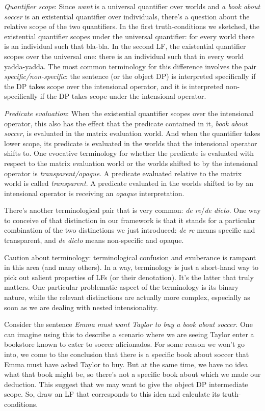\emph{Quantifier scope}: Since \emph{want} is a universal quantifier over
worlds and \emph{a book about soccer} is an existential quantifier over
individuals, there's a question about the relative scope of the two quantifiers.
In the first truth-conditions we sketched, the existential quantifier scopes
under the universal quantifier: for every world there is an individual such that
bla-bla. In the second LF, the existential quantifier scopes over the universal
one: there is an individual such that in every world yadda-yadda. The most
common terminology for this difference involves the pair
\emph{specific/non-specific}: the sentence (or the object DP) is interpreted
specifically if the DP takes scope over the intensional operator, and it is
interpreted non-specifically if the DP takes scope under the intensional operator.

\emph{Predicate evaluation}: When the existential quantifier scopes over the
intensional operator, this also has the effect that the predicate contained in
it, \emph{book about soccer}, is evaluated in the matrix evaluation world. And
when the quantifier takes lower scope, its predicate is evaluated in the worlds
that the intensional operator shifts to. One evocative terminology for whether
the predicate is evaluated with respect to the matrix evaluation world or the
worlds shifted to by the intensional operator is \emph{transparent/opaque}. A
predicate evaluated relative to the matrix world is called \emph{transparent}. A
predicate evaluated in the worlds shifted to by an intensional operator is
receiving an \emph{opaque} interpretation.

There's another terminological pair that is very common: \emph{de re}/\emph{de
  dicto}. One way to conceive of that distinction in our framework is that it
stands for a particular combination of the two distinctions we just introduced:
\emph{de re} means specific and transparent, and \emph{de dicto} means
non-specific and opaque.

Caution about terminology: terminological confusion and exuberance is rampant in
this area (and many others). In a way, terminology is just a short-hand way to
pick out salient properties of LFs (or their denotation). It's the latter that
truly matters. One particular problematic aspect of the terminology is its
binary nature, while the relevant distinctions are actually more complex,
especially as soon as we are dealing with nested intensionality.

\begin{exercise}
  Consider the sentence \emph{Emma must want Taylor to buy a book about soccer}.
  One can imagine using this to describe a scenario where we are seeing Taylor
  enter a bookstore known to cater to soccer aficionados. For some reason we
  won't go into, we come to the conclusion that there is a specific book about
  soccer that Emma must have asked Taylor to buy. But at the same time, we have
  no idea what that book might be, so there's not a specific book about which we
  made our deduction. This suggest that we may want to give the object DP
  intermediate scope. So, draw an LF that corresponds to this idea and calculate
  its truth-conditions. \eex
\end{exercise}

